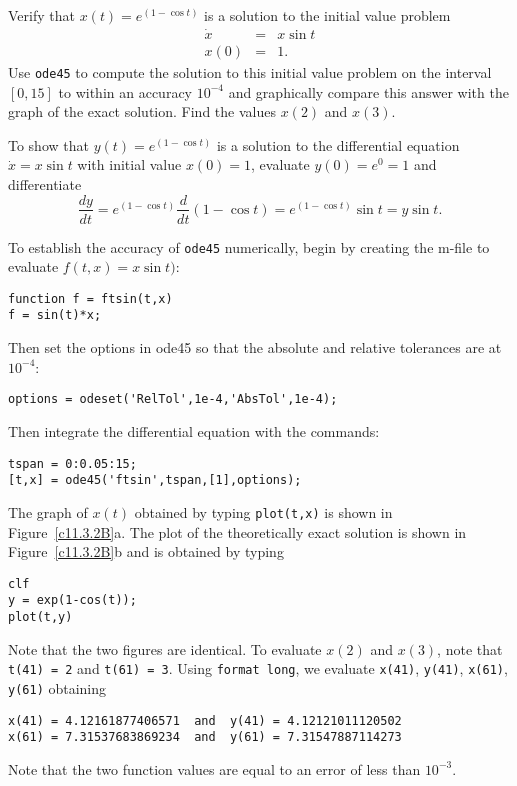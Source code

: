 \documentclass{ximera}
\begin{document}
\begin{computerExercise}  \label{c11.3.2B}
Verify that $x(t) = e^{(1-\cos t)}$ is a solution to the initial value problem
\[
\begin{array}{rcl}
\dot{x} & = & x\sin t \\
x(0) & = & 1.
\end{array}
\]
Use {\tt ode45} to compute the solution to this initial value problem on the
interval $[0,15]$ to within an accuracy $10^{-4}$ and graphically compare 
this answer with the graph of the exact solution.  Find the values $x(2)$ 
and $x(3)$. 

\begin{solution}

To show that $y(t)=e^{(1-\cos t)}$ is a solution to the differential equation
$\dot{x}=x\sin t$ with initial value $x(0)=1$, evaluate $y(0)=e^0=1$ and
differentiate
\[
\frac{dy}{dt} = e^{(1-\cos t)}\frac{d}{dt}(1-\cos t) = 
e^{(1-\cos t)}\sin t = y\sin t.
\]

To establish the accuracy of {\tt ode45} numerically, begin by creating the 
m-file to evaluate $f(t,x)=x\sin t)$:
\begin{verbatim}
function f = ftsin(t,x)
f = sin(t)*x;
\end{verbatim}
Then set the options in {\sf ode45} so that the absolute and relative
tolerances are at $10^{-4}$:
\begin{verbatim}
options = odeset('RelTol',1e-4,'AbsTol',1e-4);
\end{verbatim}
Then integrate the differential equation with the commands:
\begin{verbatim}
tspan = 0:0.05:15;
[t,x] = ode45('ftsin',tspan,[1],options);
\end{verbatim}
The graph of $x(t)$ obtained by typing {\tt plot(t,x)} is shown in
Figure~\ref{c11.3.2B}a.  The plot of the theoretically exact solution
is shown in Figure~\ref{c11.3.2B}b and is obtained by typing
\begin{verbatim}
clf
y = exp(1-cos(t));
plot(t,y)
\end{verbatim}
Note that the two figures are identical.  To evaluate $x(2)$ and $x(3)$,
note that {\tt t(41) = 2} and {\tt t(61) = 3}.  Using {\tt format long}, we
evaluate {\tt x(41)}, {\tt y(41)}, {\tt x(61)}, {\tt y(61)} obtaining
\begin{verbatim}
x(41) = 4.12161877406571  and  y(41) = 4.12121011120502
x(61) = 7.31537683869234  and  y(61) = 7.31547887114273
\end{verbatim}
Note that the two function values are equal to an error of less than 
$10^{-3}$.

\begin{figure}[htb]
     \centerline{%
     }
\end{figure} 




\end{solution}
\end{computerExercise}
\end{document}
